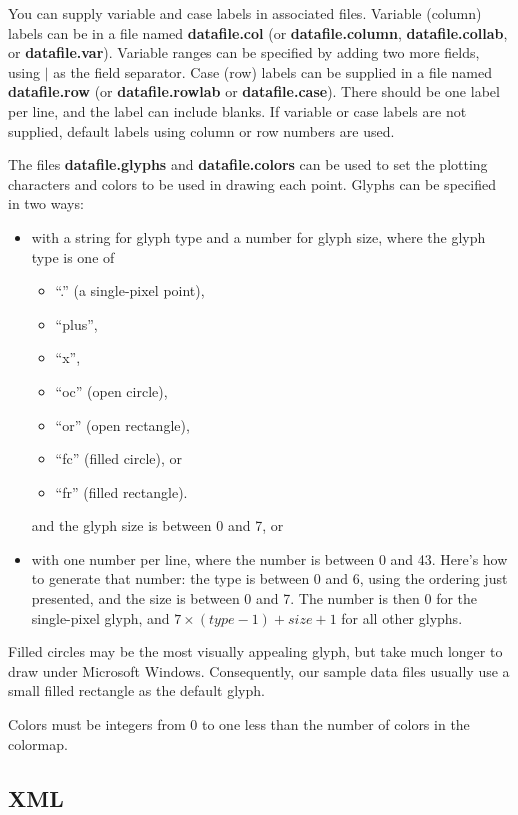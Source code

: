 \documentclass[11pt]{article}
\begin{document}
You can supply variable and case labels in associated files.  Variable
(column) labels can be in a file named {\bf datafile.col} (or {\bf
datafile.column}, {\bf datafile.collab}, or {\bf datafile.var}).  Variable
ranges can be specified by adding two more fields, using $|$ as the
field separator.  Case (row) labels can be supplied in a file named {\bf
datafile.row} (or {\bf data\-file.row\-lab} or {\bf data\-file.case}).
There should be one label per line, and the label can include blanks.
If variable or case labels are not supplied, default labels using column
or row numbers are used.

The files {\bf datafile.glyphs} and {\bf datafile.colors} can be
used to set the plotting characters and colors to be used in
drawing each point.  Glyphs can be specified in two ways:

\begin{itemize}
\item with a string for glyph type and a number for glyph size, where the
glyph type is one of
  \begin {itemize}
  \itemsep 0em
  \item ``.'' (a single-pixel point),
  \item ``plus'',
  \item ``x'',
  \item ``oc'' (open circle),
  \item ``or'' (open rectangle),
  \item ``fc'' (filled circle), or
  \item ``fr'' (filled rectangle).
  \end {itemize}
and the glyph size is between 0 and 7, or

\item with one number per line, where the number is between 0 and
43.  Here's how to generate that number: the type is between 0 and 6,
using the ordering just presented, and the size is between 0 and 7.
The number is then 0 for the single-pixel glyph, and
$7 \times (type-1) + size + 1$ for all other glyphs.
\end{itemize}

Filled circles may be the most visually appealing glyph, but take
much longer to draw under Microsoft Windows.  Consequently, our
sample data files usually use a small filled rectangle as the default
glyph.

Colors must be integers from 0 to one less than the number of colors in
the colormap.

\subsection {XML}
\label{slbl:XML}
\end{document}

